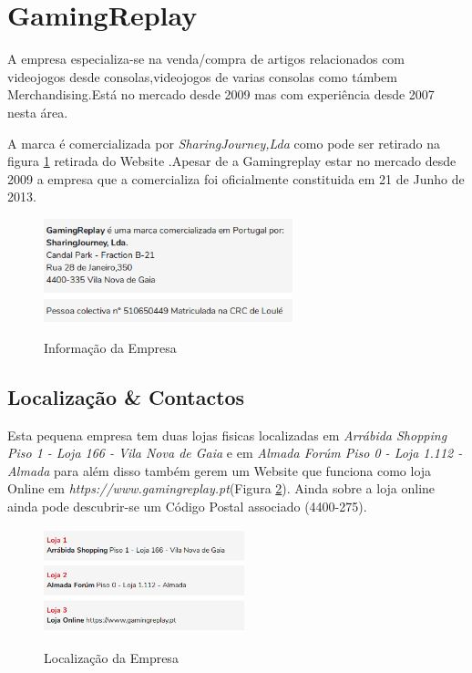 \section{GamingReplay}

A empresa especializa-se na venda/compra de artigos relacionados com videojogos desde consolas,videojogos de varias consolas como támbem Merchandising.Está no mercado desde 2009 mas com experiência desde 2007 nesta área.

A marca é comercializada por \emph{SharingJourney,Lda} como pode ser retirado na figura \ref{fig:LocEmpresa}  retirada do Website .Apesar de a Gamingreplay estar no mercado desde 2009 a empresa que a comercializa foi oficialmente constituida em 21 de Junho de 2013.

\begin{figure}[h!]
\caption{Informação da Empresa}
\centering
\includegraphics[width=\textwidth,height=3cm,keepaspectratio]{Images/LocEmpresa.png}
\label{fig:LocEmpresa}
\end{figure}

\subsection{Localização \& Contactos}

Esta pequena empresa tem duas lojas fisicas localizadas em \emph{Arrábida Shopping Piso 1 - Loja 166 - Vila Nova de Gaia} e em \emph{Almada Forúm Piso 0 - Loja 1.112 - Almada} para além disso também gerem um Website que funciona como loja Online em \emph{https://www.gamingreplay.pt}(Figura \ref{fig:LocLojas}).
Ainda sobre a loja online ainda pode descubrir-se um Código Postal associado (4400-275).

\begin{figure}[h!]
\caption{Localização da Empresa}
\centering
\includegraphics[width=\textwidth,height=3cm,keepaspectratio]{Images/LocLojas.png}
\label{fig:LocLojas}
\end{figure}

